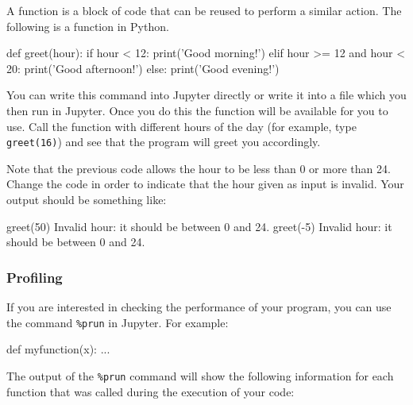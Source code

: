 A function is a block of code that can be reused to perform a similar action.
The following is a function in Python. 

\begin{python}
def greet(hour):
    if hour < 12:
        print('Good morning!')
    elif hour >= 12 and hour < 20:
        print('Good afternoon!')
    else:
        print('Good evening!')
\end{python}

You can write this command into Jupyter directly or write it into a file which you then run in Jupyter. Once you do this the function will be available for you to use. Call the function  with different hours of the day (for example, type \texttt{greet(16)}) and see that the program will greet you accordingly.

\begin{exercise}
Note that the previous code allows the hour to be less than 0 or more than 24.  Change the code in order to indicate that the hour given as input is invalid.  Your output should be something like:

\begin{python}
greet(50)
Invalid hour: it should be between 0 and 24.
greet(-5)
Invalid hour: it should be between 0 and 24.
\end{python}

\end{exercise}

\subsubsection{Profiling}

If you are interested in checking the performance of your program, you can use the command \texttt{\%prun} in Jupyter. For example:

\begin{python}
def myfunction(x):
    ...

\end{python}

The output of the \texttt{\%prun} command will show the following information
for each function that was called during the execution of your code:

